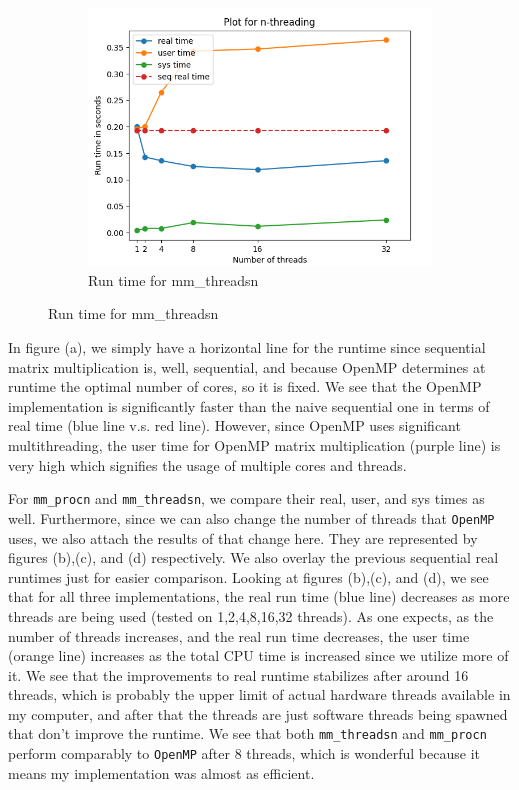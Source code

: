 \documentclass{article}
\begin{document}
\begin{figure}[h]
\begin{subfigure}[t]{.5\textwidth}
    \includegraphics[width=\linewidth]{mm_threadsn.png}
    \caption{Run time for mm\_threadsn}
  \end{subfigure}

\end{figure}

In figure (a), we simply have a horizontal line for the runtime since sequential matrix multiplication is, well, sequential, and because OpenMP determines at runtime the optimal number of cores, so it is fixed. We see that the OpenMP implementation is significantly faster than the naive sequential one in terms of real time (blue line v.s. red line). However, since OpenMP uses significant multithreading, the user time for OpenMP matrix multiplication (purple line) is very high which signifies the usage of multiple cores and threads.



For \texttt{mm\_procn} and \texttt{mm\_threadsn}, we compare their real, user, and sys times as well. Furthermore, since we can also change the number of threads that \texttt{OpenMP} uses, we also attach the results of that change here. They are represented by figures (b),(c), and (d) respectively. We also overlay the previous sequential real runtimes just for easier comparison. Looking at figures (b),(c), and (d), we see that for all three implementations, the real run time (blue line) decreases as more threads are being used (tested on 1,2,4,8,16,32 threads). As one expects, as the number of threads increases, and the real run time decreases, the user time (orange line) increases as the total CPU time is increased since we utilize more of it. We see that the improvements to real runtime stabilizes after around 16 threads, which is probably the upper limit of actual hardware threads available in my computer, and after that the threads are just software threads being spawned that don't improve the runtime. We see that both \texttt{mm\_threadsn} and \texttt{mm\_procn} perform comparably to \texttt{OpenMP} after 8 threads, which is wonderful because it means my implementation was almost as efficient.
\end{document}
